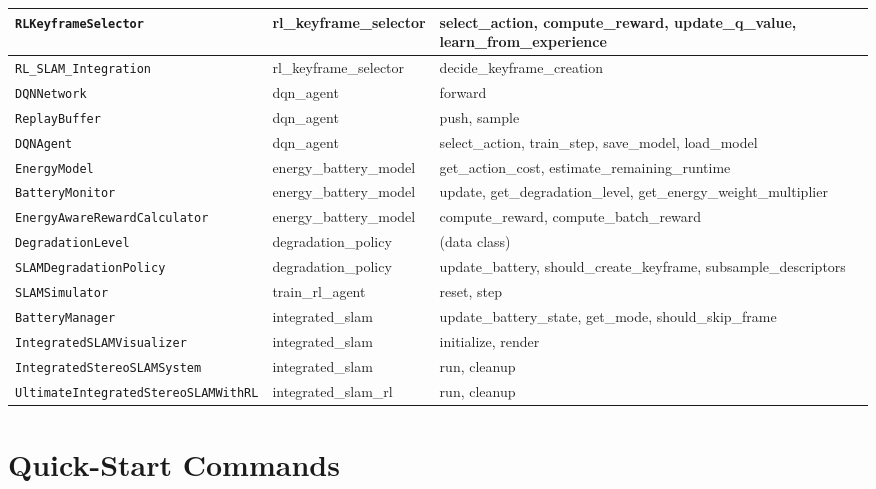 \documentclass[12pt,a4paper,twoside]{report}
\theoremstyle{definition}
\newcommand{\code}[1]{\texttt{#1}}
\begin{document}
\begin{longtable}{|p{5cm}|p{3cm}|p{5.5cm}|}
\code{RLKeyframeSelector} & rl\_keyframe\_selector & select\_action, compute\_reward, update\_q\_value, learn\_from\_experience \\ \hline
\code{RL\_SLAM\_Integration} & rl\_keyframe\_selector & decide\_keyframe\_creation \\ \hline
\code{DQNNetwork} & dqn\_agent & forward \\ \hline
\code{ReplayBuffer} & dqn\_agent & push, sample \\ \hline
\code{DQNAgent} & dqn\_agent & select\_action, train\_step, save\_model, load\_model \\ \hline
\code{EnergyModel} & energy\_battery\_model & get\_action\_cost, estimate\_remaining\_runtime \\ \hline
\code{BatteryMonitor} & energy\_battery\_model & update, get\_degradation\_level, get\_energy\_weight\_multiplier \\ \hline
\code{EnergyAwareRewardCalculator} & energy\_battery\_model & compute\_reward, compute\_batch\_reward \\ \hline
\code{DegradationLevel} & degradation\_policy & (data class) \\ \hline
\code{SLAMDegradationPolicy} & degradation\_policy & update\_battery, should\_create\_keyframe, subsample\_descriptors \\ \hline
\code{SLAMSimulator} & train\_rl\_agent & reset, step \\ \hline
\code{BatteryManager} & integrated\_slam & update\_battery\_state, get\_mode, should\_skip\_frame \\ \hline
\code{IntegratedSLAMVisualizer} & integrated\_slam & initialize, render \\ \hline
\code{IntegratedStereoSLAMSystem} & integrated\_slam & run, cleanup \\ \hline
\code{UltimateIntegratedStereoSLAMWithRL} & integrated\_slam\_rl & run, cleanup \\ \hline
\end{longtable}

\chapter{Quick-Start Commands}
\end{document}
